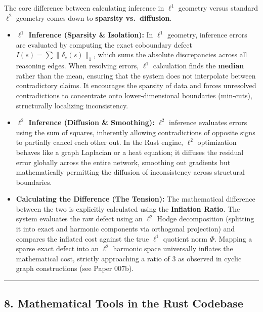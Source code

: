 \documentclass[
]{article}
\providecommand{\tightlist}{%
  \setlength{\itemsep}{0pt}\setlength{\parskip}{0pt}}
\begin{document}
The core difference between calculating inference in \(\ell^1\) geometry
versus standard \(\ell^2\) geometry comes down to \textbf{sparsity
vs.~diffusion}.

\begin{itemize}
\tightlist
\item
  \textbf{\(\ell^1\) Inference (Sparsity \& Isolation):} In \(\ell^1\)
  geometry, inference errors are evaluated by computing the exact
  coboundary defect \(I(s) = \sum \|\delta_e(s)\|_1\), which sums the
  absolute discrepancies across all reasoning edges. When resolving
  errors, \(\ell^1\) calculation finds the \textbf{median} rather than
  the mean, ensuring that the system does not interpolate between
  contradictory claims. It encourages the sparsity of data and forces
  unresolved contradictions to concentrate onto lower-dimensional
  boundaries (min-cuts), structurally localizing inconsistency.
\item
  \textbf{\(\ell^2\) Inference (Diffusion \& Smoothing):} \(\ell^2\)
  inference evaluates errors using the sum of squares, inherently
  allowing contradictions of opposite signs to partially cancel each
  other out. In the Rust engine, \(\ell^2\) optimization behaves like a
  graph Laplacian or a heat equation; it diffuses the residual error
  globally across the entire network, smoothing out gradients but
  mathematically permitting the diffusion of inconsistency across
  structural boundaries.
\item
  \textbf{Calculating the Difference (The Tension):} The mathematical
  difference between the two is explicitly calculated using the
  \textbf{Inflation Ratio}. The system evaluates the raw defect using an
  \(\ell^2\) Hodge decomposition (splitting it into exact and harmonic
  components via orthogonal projection) and compares the inflated cost
  against the true \(\ell^1\) quotient norm \(\Phi\). Mapping a sparse
  exact defect into an \(\ell^2\) harmonic space universally inflates
  the mathematical cost, strictly approaching a ratio of 3 as observed
  in cyclic graph constructions (see Paper 007b).
\end{itemize}

\begin{center}\rule{0.5\linewidth}{0.5pt}\end{center}

\subsection{8. Mathematical Tools in the Rust
Codebase}\label{mathematical-tools-in-the-rust-codebase}
\end{document}
